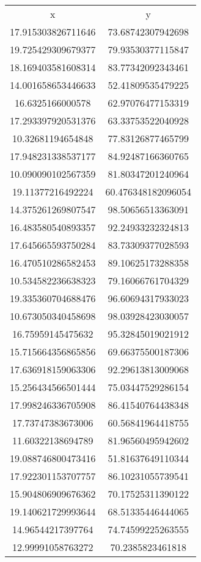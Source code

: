 \begin{table}
\begin{tabular}{cc}
x & y \\
17.915303826711646 & 73.68742307942698 \\
19.725429309679377 & 79.93530377115847 \\
18.169403581608314 & 83.77342092343461 \\
14.001658653446633 & 52.41809535479225 \\
16.6325166000578 & 62.97076477153319 \\
17.293397920531376 & 63.33753522040928 \\
10.32681194654848 & 77.83126877465799 \\
17.948231338537177 & 84.92487166360765 \\
10.090090102567359 & 81.80347201240964 \\
19.11377216492224 & 60.476348182096054 \\
14.375261269807547 & 98.50656513363091 \\
16.483580540893357 & 92.24933232324813 \\
17.645665593750284 & 83.73309377028593 \\
16.470510286582453 & 89.10625173288358 \\
10.534582236638323 & 79.16066761704329 \\
19.335360704688476 & 96.60694317933023 \\
10.673050340458698 & 98.03928423030057 \\
16.75959145475632 & 95.32845019021912 \\
15.715664356865856 & 69.66375500187306 \\
17.636918159063306 & 92.29613813009068 \\
15.256434566501444 & 75.03447529286154 \\
17.998246336705908 & 86.41540764438348 \\
17.73747383673006 & 60.56841964418755 \\
11.60322138694789 & 81.96560495942602 \\
19.088746800473416 & 51.81637649110344 \\
17.922301153707757 & 86.10231055739541 \\
15.904806909676362 & 70.17525311390122 \\
19.140621729993644 & 68.51335446444065 \\
14.96544217397764 & 74.74599225263555 \\
12.99991058763272 & 70.2385823461818 \\

\end{tabular}
\end{table}
